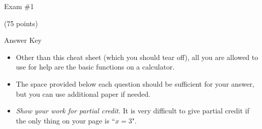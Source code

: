 \documentclass[twoside]{article}
\begin{document}
\pagestyle{empty}
\thispagestyle{empty}

\vspace*{-1cm}
\enlargethispage{4\baselineskip}
\begin{center}
\Large Exam \#1 \begin{EXAM}(75 points)\end{EXAM} \begin{KEY} Answer Key \end{KEY}
\end{center}
\normalsize
\bigskip

\begin{EXAM}

\begin{itemize}

\item Other than this cheat sheet (which you should tear off), all you are allowed to use for help are the basic functions on a calculator.

\item The space provided below each question should be sufficient for your answer, but you can use additional paper if needed.

\item \emph{Show your work for partial credit.} It is very difficult to give partial credit if the only thing on your page is ``$x=3$".

\begin{comment}
\item Take the exam during an \emph{uninterrupted period of no more than 2 hours}. (It should not take that long.) The space provided below each question should be sufficient for your answer, but you can use additional paper if needed. \emph{You are encouraged to show your work for partial credit.} It is very difficult to give partial credit if the only thing on your page is ``$x=3$".

\item \emph{Other than this cheat sheet, all you are allowed to use for help are the basic functions on a calculator.} Partial translation: no books, no notes, no websites, no talking to other people, and no advanced calculator features like programmable functions or present value formulas.

\item People who have taken the exam can talk to each other all they want, and people who have not taken the exam can talk to each other all they want, but communication between the two groups about class should be limited to three phrases: ``Yes", ``No", and ``Have you taken the exam?"


\end{comment}
\end{itemize}
\end{EXAM}
\end{document}

